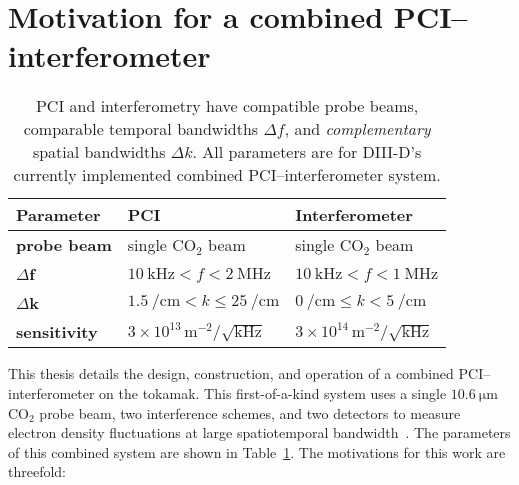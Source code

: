 \section{Motivation for a combined PCI--interferometer}
\begin{table}
  \centering
  \renewcommand{\arraystretch}{1.25}%
  \begin{tabular}{%
    >{\centering}m{2.25cm} >{\centering}m{4.1cm} >{\centering}m{4.0cm}
  }
    \toprule%
    \textbf{Parameter} & \textbf{PCI} & \textbf{Interferometer}
    \tabularnewline%
    \midrule
    \textbf{probe beam} & single CO$_2$ beam & single CO$_2$ beam
    \tabularnewline%
    $\Delta$\textbf{f}
    & $\SI{10}{\kilo\hertz} < f < \SI{2}{\mega\hertz}$
    & $\SI{10}{\kilo\hertz} < f < \SI{1}{\mega\hertz}$
    \tabularnewline%
    $\Delta$\textbf{k}
    & $\SI{1.5}{\per\centi\meter} < k \leq \SI{25}{\per\centi\meter}$
    & $\SI{0}{\per\centi\meter} \leq k < \SI{5}{\per\centi\meter}$
    \tabularnewline%
    \textbf{sensitivity}
    & $3 \times 10^{13} \, \text{m}^{-2} / \sqrt{\text{kHz}}$
    & $3 \times 10^{14} \, \text{m}^{-2} / \sqrt{\text{kHz}}$
    \tabularnewline%
    \toprule%
  \end{tabular}
  \caption[Parameters of \diiid's combined PCI-interferometer]{%
    PCI and interferometry have compatible probe beams,
    comparable temporal bandwidths $\Delta f$, and
    \emph{complementary} spatial bandwidths $\Delta k$.
    All parameters are for DIII-D's currently implemented
    combined PCI--interferometer system.
  }%
\label{table:Introduction:PCI_interferometer}
\end{table}

This thesis details the design, construction, and operation
of a combined PCI--interferometer on the \diiid\space tokamak.
This first-of-a-kind system uses
a single $\SI{10.6}{\micro\meter}$ CO$_2$ probe beam,
two interference schemes, and
two detectors
to measure electron density fluctuations
at large spatiotemporal bandwidth~\cite{davis_rsi16}.
The parameters of this combined system are shown in
Table~\ref{table:Introduction:PCI_interferometer}.
The motivations for this work are threefold:

